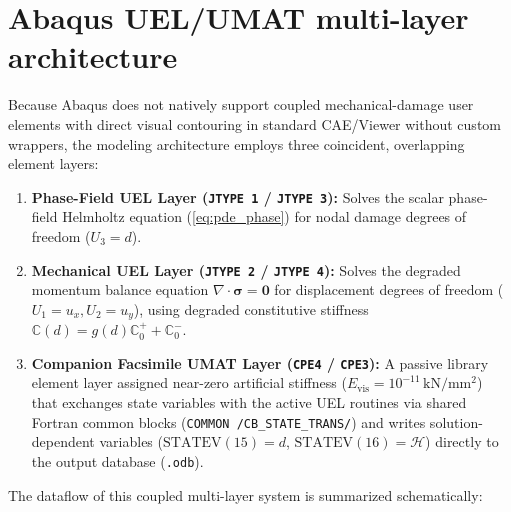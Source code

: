 \section{Abaqus UEL/UMAT multi-layer architecture}
Because Abaqus does not natively support coupled mechanical-damage user elements with direct visual contouring in standard CAE/Viewer without custom wrappers, the modeling architecture employs three coincident, overlapping element layers:
\begin{enumerate}
  \item \textbf{Phase-Field UEL Layer (\texttt{JTYPE 1} / \texttt{JTYPE 3}):} Solves the scalar phase-field Helmholtz equation (\ref{eq:pde_phase}) for nodal damage degrees of freedom ($U_3 = d$).
  \item \textbf{Mechanical UEL Layer (\texttt{JTYPE 2} / \texttt{JTYPE 4}):} Solves the degraded momentum balance equation $\nabla \cdot \boldsymbol\sigma = \mathbf{0}$ for displacement degrees of freedom ($U_1 = u_x, U_2 = u_y$), using degraded constitutive stiffness $\mathbb{C}(d) = g(d)\mathbb{C}_0^+ + \mathbb{C}_0^-$.
  \item \textbf{Companion Facsimile UMAT Layer (\texttt{CPE4} / \texttt{CPE3}):} A passive library element layer assigned near-zero artificial stiffness ($E_{\mathrm{vis}} = 10^{-11}\,\mathrm{kN/mm^2}$) that exchanges state variables with the active UEL routines via shared Fortran common blocks (\texttt{COMMON /CB\_STATE\_TRANS/}) and writes solution-dependent variables ($\text{STATEV}(15) = d$, $\text{STATEV}(16) = \mathcal{H}$) directly to the output database (\texttt{.odb}).
\end{enumerate}

The dataflow of this coupled multi-layer system is summarized schematically:
\begin{center}
\end{center}

